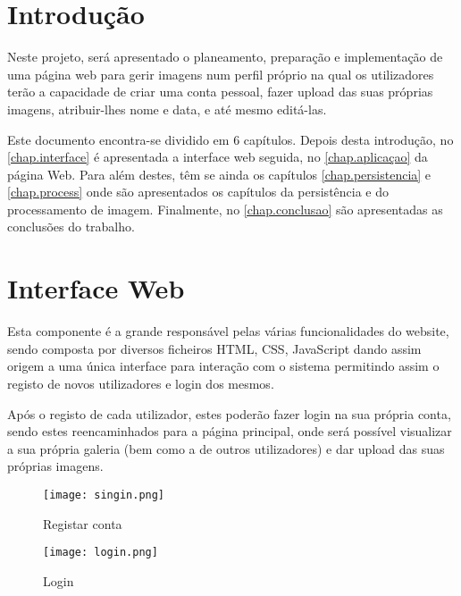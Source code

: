 \documentclass{report}
\begin{document}
\clearpage
{}

\chapter{Introdução}
\label{chap.introducao}

Neste projeto, será apresentado o planeamento, preparação e implementação de uma página web para gerir imagens num perfil próprio na qual os utilizadores terão a capacidade de criar uma conta pessoal, fazer upload das suas próprias imagens, atribuir-lhes nome e data, e até mesmo editá-las. 

Este documento encontra-se dividido em 6 capítulos. Depois desta introdução,
no \autoref{chap.interface} é apresentada a interface web seguida,
no \autoref{chap.aplicaçao} da página Web. Para além destes, têm se ainda os capítulos \autoref{chap.persistencia} e \autoref{chap.process} onde são apresentados os capítulos da persistência e do processamento de imagem.
Finalmente, no \autoref{chap.conclusao} são apresentadas
as conclusões do trabalho.


\chapter{Interface Web}
\label{chap.interface}

Esta componente é a grande responsável pelas várias funcionalidades do website, sendo composta por diversos ficheiros HTML, CSS, JavaScript dando assim origem a uma única interface para interação com o sistema permitindo assim o registo de novos utilizadores e login dos mesmos.

Após o registo de cada utilizador, estes poderão fazer login na sua própria conta, sendo estes reencaminhados para a página principal, onde será possível visualizar a sua própria galeria (bem como a de outros utilizadores) e dar upload das suas próprias imagens.

\begin{figure}[h]
  \centering
  \begin{adjustbox}{center}
    \texttt{[image: singin.png]}
  \end{adjustbox}
  \caption{Registar conta}
  \label{fig:singin}
\end{figure}

\begin{figure}[h]
  \centering
  \begin{adjustbox}{center}
    \texttt{[image: login.png]}
  \end{adjustbox}
  \caption{Login}
  \label{fig:singin}
\end{figure}
\end{document}
